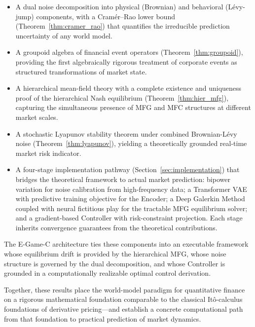 \documentclass[12pt,a4paper]{article}
\theoremstyle{plain}
\theoremstyle{definition}
\newcommand{\1}{\mathbbm{1}}
\begin{document}
\begin{itemize}
\item A dual noise decomposition into physical (Brownian) and behavioral (Lévy-jump)
  components, with a Cramér--Rao lower bound (Theorem~\ref{thm:cramer_rao})
  that quantifies the irreducible prediction uncertainty of any world model.

\item A groupoid algebra of financial event operators
  (Theorem~\ref{thm:groupoid}), providing the first algebraically rigorous
  treatment of corporate events as structured transformations of market state.

\item A hierarchical mean-field theory with a complete existence and uniqueness
  proof of the hierarchical Nash equilibrium (Theorem~\ref{thm:hier_mfg}),
  capturing the simultaneous presence of MFG and MFC structures at different
  market scales.

\item A stochastic Lyapunov stability theorem under combined Brownian-Lévy noise
  (Theorem~\ref{thm:lyapunov}), yielding a theoretically grounded real-time
  market risk indicator.

\item A four-stage implementation pathway (Section~\ref{sec:implementation})
  that bridges the theoretical framework to actual market prediction: bipower
  variation for noise calibration from high-frequency data; a Transformer VAE
  with predictive training objective for the Encoder; a Deep Galerkin Method
  coupled with neural fictitious play for the tractable MFG equilibrium solver;
  and a gradient-based Controller with risk-constraint projection.  Each stage
  inherits convergence guarantees from the theoretical contributions.
\end{itemize}

The E-Game-C architecture ties these components into an executable framework
whose equilibrium drift is provided by the hierarchical MFG, whose noise
structure is governed by the dual decomposition, and whose Controller is grounded
in a computationally realizable optimal control derivation.

Together, these results place the world-model paradigm for quantitative
finance on a rigorous mathematical foundation comparable to the classical
Itô-calculus foundations of derivative pricing—and establish a concrete
computational path from that foundation to practical prediction of market dynamics.
\end{document}
